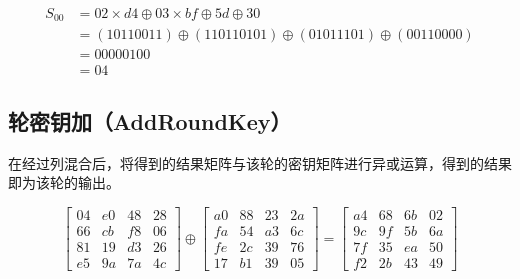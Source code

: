 \vspace{-1cm}

\begin{align*}
    S_{00} & = 02 \times d4 \oplus 03 \times bf \oplus 5d \oplus 30               \\
           & = (10110011) \oplus (110110101) \oplus (01011101)  \oplus (00110000) \\
           & = 00000100                                                           \\
           & = 04
\end{align*}

\vspace{0.5cm}

\subsection{轮密钥加（AddRoundKey）}

在经过列混合后，将得到的结果矩阵与该轮的密钥矩阵进行异或运算，得到的结果即为该轮的输出。

$$
    \begin{bmatrix}
        04 & e0 & 48 & 28 \\
        66 & cb & f8 & 06 \\
        81 & 19 & d3 & 26 \\
        e5 & 9a & 7a & 4c
    \end{bmatrix}
    \oplus
    \begin{bmatrix}
        a0 & 88 & 23 & 2a \\
        fa & 54 & a3 & 6c \\
        fe & 2c & 39 & 76 \\
        17 & b1 & 39 & 05
    \end{bmatrix}
    =
    \begin{bmatrix}
        a4 & 68 & 6b & 02 \\
        9c & 9f & 5b & 6a \\
        7f & 35 & ea & 50 \\
        f2 & 2b & 43 & 49
    \end{bmatrix}
$$

\newpage